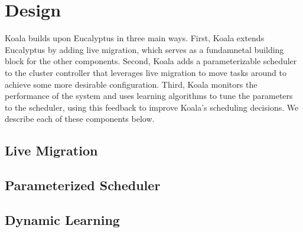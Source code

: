 \section{Design}

Koala builds upon Eucalyptus in three main ways.  First, Koala extends
Eucalyptus by adding live migration, which serves as a fundamnetal building
block for the other components.  Second, Koala adds a parameterizable scheduler
to the cluster controller that leverages live migration to move tasks around to
achieve some more desirable configuration.  Third, Koala monitors the
performance of the system and uses learning algorithms to tune the parameters to
the scheduler, using this feedback to improve Koala's scheduling decisions.  We
describe each of these components below.

\subsection{Live Migration}


\subsection{Parameterized Scheduler}

\subsection{Dynamic Learning}



